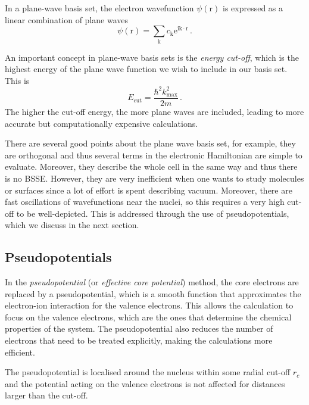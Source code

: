 \documentclass{article}
\theoremstyle{plain}\theoremheaderfont{\normalfont\itshape}\theorembodyfont{\rmfamily}\theoremseparator{.}\newtheorem*{rem}{Remark}\newtheorem*{ex}{Example}\newtheorem*{proof}{Proof}\newtheorem*{altp}{Alternative proof}
\theoremstyle{plain}\theoremheaderfont{\normalfont\bfseries}\theorembodyfont{\rmfamily}\theoremseparator{.}\newtheorem{thm}{Theorem}[section]\newtheorem{lem}[thm]{Lemma}\newtheorem{prop}[thm]{Proposition}\newtheorem*{cor}{Corollary}\newtheorem{defn}[thm]{Definition}\newtheorem{clm}[thm]{Claim}\newtheorem{clminproof}{Claim}\newtheorem{pos}{Postulate}[section]
\theoremstyle{break}\theoremheaderfont{\normalfont\itshape}\theorembodyfont{\rmfamily}\theoremseparator{.\medskip}\newtheorem*{proofskip}{Proof}\newtheorem*{exs}{Examples}\newtheorem*{rems}{Remarks}
\theoremstyle{break}\theoremheaderfont{\normalfont\bfseries}\theorembodyfont{\rmfamily}\theoremseparator{.\medskip}\newtheorem{lemskip}[thm]{Lemma}\newtheorem{defnskip}[thm]{Definition}\newtheorem{propskip}[thm]{Proposition}\newtheorem{thmskip}[thm]{Theorem}
\numberwithin{equation}{section}
\newcommand{\ii}{\mathrm{i}}
\newcommand{\ee}{\mathrm{e}}
\newcommand{\vb}[1]{\bm{\mathrm{#1}}}
\newcommand{\vdot}{\,\bm{\mathrm{\cdot}}\,}
\begin{document}
    In a plane-wave basis set, the electron wavefunction \(\psi(\vb{r})\) is expressed as a linear combination of plane waves
    \begin{equation}
        \psi(\vb{r})=\sum_{\vb{k}}c_{\vb{k}}\ee^{\ii\vb{k}\vdot\vb{r}}\,.
    \end{equation}

    An important concept in plane-wave basis sets is the \textit{energy cut-off}, which is the highest energy of the plane wave function we wish to include in our basis set. This is
    \begin{equation}
        E_{\text{cut}}=\frac{\hbar^2k_{\text{max}}^2}{2m}\,.
    \end{equation}
    The higher the cut-off energy, the more plane waves are included, leading to more accurate but computationally expensive calculations.

    There are several good points about the plane wave basis set, for example, they are orthogonal and thus several terms in the electronic Hamiltonian are simple to evaluate. Moreover, they describe the whole cell in the same way and thus there is no BSSE. However, they are very inefficient when one wants to study molecules or surfaces since a lot of effort is spent describing vacuum. Moreover, there are fast oscillations of wavefunctions near the nuclei, so this requires a very high cut-off to be well-depicted. This is addressed through the use of pseudopotentials, which we discuss in the next section.

    \subsection{Pseudopotentials}
    In the \textit{pseudopotential} (or \textit{effective core potential}) method, the core electrons are replaced by a pseudopotential, which is a smooth function that approximates the electron-ion interaction for the valence electrons. This allows the calculation to focus on the valence electrons, which are the ones that determine the chemical properties of the system. The pseudopotential also reduces the number of electrons that need to be treated explicitly, making the calculations more efficient.

    The pseudopotential is localised around the nucleus within some radial cut-off \(r_c\) and the potential acting on the valence electrons is not affected for distances larger than the cut-off.
\end{document}
